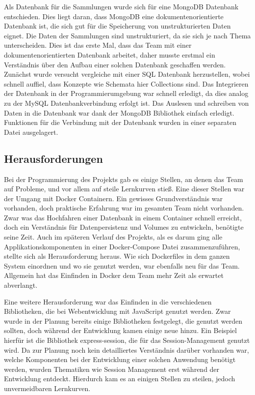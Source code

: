 Als Datenbank für die Sammlungen wurde sich für eine MongoDB Datenbank entschieden.
Dies liegt daran, dass MongoDB eine dokumentenorientierte Datenbank ist, die sich gut für die Speicherung von unstrukturierten Daten eignet.
Die Daten der Sammlungen sind unstrukturiert, da sie sich je nach Thema unterscheiden.
Dies ist das erste Mal, dass das Team mit einer dokumentenorientierten Datenbank arbeitet, daher musste erstmal ein Verständnis über den Aufbau einer solchen Datenbank geschaffen werden.
Zunächst wurde versucht vergleiche mit einer SQL Datenbank herzustellen, wobei schnell auffiel, dass Konzepte wie Schemata hier Collections sind.
Das Integrieren der Datenbank in der Programmierumgebung war schnell erledigt, da dies analog zu der MySQL Datenbankverbindung erfolgt ist.
Das Auslesen und schreiben von Daten in die Datenbank war dank der MongoDB Bibliothek einfach erledigt.
Funktionen für die Verbindung mit der Datenbank wurden in einer separaten Datei ausgelagert.


\subsection{Herausforderungen}\label{subsec:Herausforderungen}

Bei der Programmierung des Projekts gab es einige Stellen, an denen das Team auf Probleme, und vor allem auf steile Lernkurven stieß.
Eine dieser Stellen war der Umgang mit Docker Containern.
Ein gewisses Grundverständnis war vorhanden, doch praktische Erfahrung war im gesamten Team nicht vorhanden.
Zwar was das Hochfahren einer Datenbank in einem Container schnell erreicht, doch ein Verständnis für Datenpersistenz und Volumes zu entwickeln, benötigte seine Zeit.
Auch im späteren Verlauf des Projekts, als es darum ging alle Applikationskomponenten in einer Docker-Compose Datei zusammenzuführen, stellte sich als Herausforderung heraus.
Wie sich Dockerfiles in dem ganzen System einordnen und wo sie genutzt werden, war ebenfalls neu für das Team.
Allgemein hat das Einfinden in Docker dem Team mehr Zeit als erwartet abverlangt.

Eine weitere Herausforderung war das Einfinden in die verschiedenen Bibliotheken, die bei Webentwicklung mit JavaScript genutzt werden.
Zwar wurde in der Planung bereits einige Bibliotheken festgelegt, die genutzt werden sollten, doch während der Entwicklung kamen einige neue hinzu.
Ein Beispiel hierfür ist die Bibliothek express-session, die für das Session-Management genutzt wird.
Da zur Planung noch kein detailliertes Verständnis darüber vorhanden war, welche Komponenten bei der Entwicklung einer solchen Anwendung benötigt werden, wurden Thematiken wie Session Management erst während der Entwicklung entdeckt.
Hierdurch kam es an einigen Stellen zu steilen, jedoch unvermeidbaren Lernkurven.

